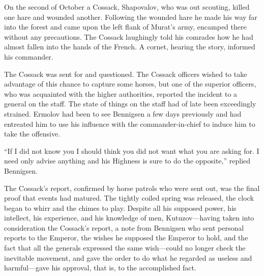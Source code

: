 On the second of October a Cossack, Shapovalov, who was out
scouting, killed one hare and wounded another. Following the
wounded hare he made his way far into the forest and came upon
the left flank of Murat's army, encamped there without any
precautions. The Cossack laughingly told his comrades how he had
almost fallen into the hands of the French.  A cornet, hearing
the story, informed his commander.

The Cossack was sent for and questioned. The Cossack officers
wished to take advantage of this chance to capture some horses,
but one of the superior officers, who was acquainted with the
higher authorities, reported the incident to a general on the
staff. The state of things on the staff had of late been
exceedingly strained. Ermolov had been to see Bennigsen a few
days previously and had entreated him to use his influence with
the commander-in-chief to induce him to take the offensive.

``If I did not know you I should think you did not want what you
are asking for. I need only advise anything and his Highness is
sure to do the opposite,'' replied Bennigsen.

The Cossack's report, confirmed by horse patrols who were sent
out, was the final proof that events had matured. The tightly
coiled spring was released, the clock began to whirr and the
chimes to play. Despite all his supposed power, his intellect,
his experience, and his knowledge of men, Kutuzov---having taken
into consideration the Cossack's report, a note from Bennigsen
who sent personal reports to the Emperor, the wishes he supposed
the Emperor to hold, and the fact that all the generals expressed
the same wish---could no longer check the inevitable movement,
and gave the order to do what he regarded as useless and
harmful---gave his approval, that is, to the accomplished fact.


